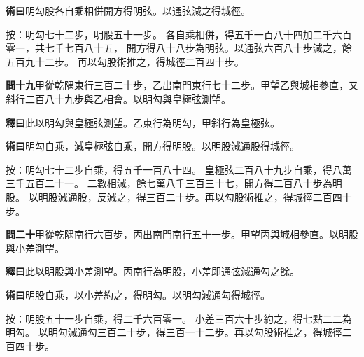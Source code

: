 \documentclass[12pt,a4paper]{article}
\begin{document}
\vspace{0.3em}

\noindent\textbf{術曰}\quad 明勾股各自乘相併開方得明弦。以通弦減之得城徑。

\vspace{0.3em}

\noindent
按：明勾七十二步，明股五十一步。
各自乘相併，得五千一百八十四加二千六百零一，共七千七百八十五，
開方得八十八步為明弦。以通弦六百八十步減之，餘五百九十二步。
再以勾股術推之，得城徑二百四十步。

\vspace{0.5em}

\noindent\textbf{問十九}\quad 甲從乾隅東行三百二十步，乙出南門東行七十二步。甲望乙與城相參直，又斜行二百八十九步與乙相會。以明勾與皇極弦測望。

\vspace{0.3em}

\noindent\textbf{釋曰}\quad 此以明勾與皇極弦測望。乙東行為明勾，甲斜行為皇極弦。

\vspace{0.3em}

\noindent\textbf{術曰}\quad 明勾自乘，減皇極弦自乘，開方得明股。以明股減通股得城徑。

\vspace{0.3em}

\noindent
按：明勾七十二步自乘，得五千一百八十四。
皇極弦二百八十九步自乘，得八萬三千五百二十一。
二數相減，餘七萬八千三百三十七，開方得二百八十步為明股。
以明股減通股，反減之，得三百二十步。再以勾股術推之，得城徑二百四十步。

\vspace{0.5em}

\noindent\textbf{問二十}\quad 甲從乾隅南行六百步，丙出南門南行五十一步。甲望丙與城相參直。以明股與小差測望。

\vspace{0.3em}

\noindent\textbf{釋曰}\quad 此以明股與小差測望。丙南行為明股，小差即通弦減通勾之餘。

\vspace{0.3em}

\noindent\textbf{術曰}\quad 明股自乘，以小差約之，得明勾。以明勾減通勾得城徑。

\vspace{0.3em}

\noindent
按：明股五十一步自乘，得二千六百零一。
小差三百六十步約之，得七點二二為明勾。
以明勾減通勾三百二十步，得三百一十二步。再以勾股術推之，得城徑二百四十步。
\end{document}

